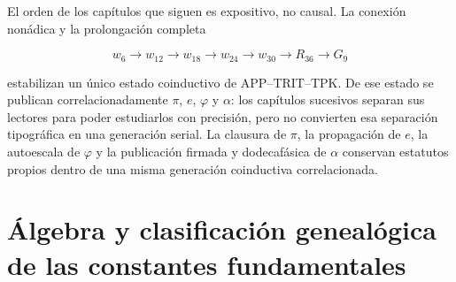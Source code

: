 


El orden de los capítulos que siguen es expositivo, no causal. La conexión
nonádica y la prolongación completa

\[
w_6\longrightarrow w_{12}\longrightarrow w_{18}\longrightarrow w_{24}
\longrightarrow w_{30}\longrightarrow R_{36}\longrightarrow G_9
\]

estabilizan un único estado coinductivo de APP--TRIT--TPK. De ese estado se
publican correlacionadamente \(\pi\), \(e\), \(\varphi\) y \(\alpha\): los
capítulos sucesivos separan sus lectores para poder estudiarlos con precisión,
pero no convierten esa separación tipográfica en una generación serial. La
clausura de \(\pi\), la propagación de \(e\), la autoescala de \(\varphi\) y
la publicación firmada y dodecafásica de \(\alpha\) conservan estatutos
propios dentro de una misma generación coinductiva correlacionada.

\newcommand{\HMTSuccessorChapterInput}[2]{%
  \chapter{#1}%
  \begingroup
  \renewcommand{\chapter}[2][]{}%
  \endgroup}

\HMTSuccessorChapterInput
  {Álgebra y clasificación genealógica de las constantes fundamentales}
  {../colaboracion/parte_iii/tex/capitulos_finales/27_algebra_clasificacion.tex}

\begin{HMTScientificOwnerSubordinated}



\end{HMTScientificOwnerSubordinated}

